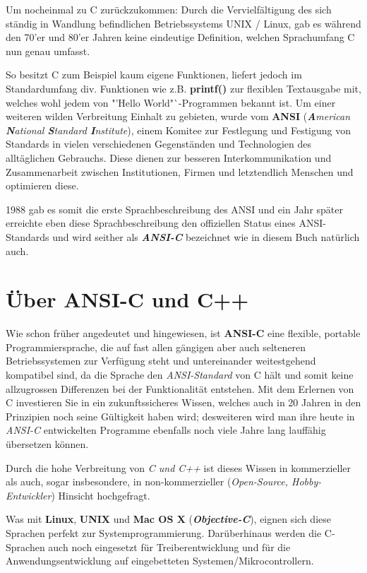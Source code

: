 \documentclass[b5paper,10pt,dvips,fleqn,titlepage,twoside]{book}
\begin{document}
Um nocheinmal zu C zurückzukommen: Durch die Vervielfältigung des sich ständig in Wandlung befindlichen Betriebssystems UNIX / Linux, gab es während den 70'er und 80'er Jahren keine eindeutige Definition, welchen Sprachumfang C nun genau umfasst.

So besitzt C zum Beispiel kaum eigene Funktionen, liefert jedoch im Standardumfang div. Funktionen wie z.B. \textbf{printf()} zur flexiblen Textausgabe mit, welches wohl jedem von "'Hello World"`-Programmen bekannt ist.
Um einer weiteren wilden Verbreitung Einhalt zu gebieten, wurde vom \textbf{ANSI} (\emph{\textbf{A}merican \textbf{N}ational \textbf{S}tandard \textbf{I}nstitute}), einem Komitee zur Festlegung und Festigung von Standards in vielen verschiedenen Gegenständen und Technologien des alltäglichen Gebrauchs. Diese dienen zur besseren Interkommunikation und Zusammenarbeit zwischen Institutionen, Firmen und letztendlich Menschen und optimieren diese.

1988 gab es somit die erste Sprachbeschreibung des ANSI und ein Jahr später erreichte eben diese Sprachbeschreibung den offiziellen Status eines ANSI-Standards und wird seither als \textbf{\emph{ANSI-C}} bezeichnet \lbrack wie in diesem Buch natürlich auch.\rbrack
\newline
\section{Über ANSI-C und C++}
Wie schon früher angedeutet und hingewiesen, ist \textbf{ANSI-C} eine flexible, portable Programmiersprache, die auf fast allen gängigen aber auch selteneren Betriebssystemen zur Verfügung steht und untereinander weitestgehend kompatibel sind, da die Sprache den \emph{ANSI-Standard} von C hält und somit keine allzugrossen Differenzen bei der Funktionalität entstehen.
Mit dem Erlernen von C investieren Sie in ein zukunftssicheres Wissen, welches auch in 20 Jahren in den Prinzipien noch seine Gültigkeit haben wird; desweiteren wird man ihre heute in \emph{ANSI-C} entwickelten Programme ebenfalls noch viele Jahre lang lauffähig übersetzen können.

Durch die hohe Verbreitung von \emph{C und C++} ist dieses Wissen in kommerzieller als auch, sogar insbesondere, in non-kommerzieller (\emph{Open-Source, Hobby-Entwickler}) Hinsicht hochgefragt.

Was mit \textbf{Linux}, \textbf{UNIX} und \textbf{Mac OS X} (\emph{\textbf{Objective-C}}), eignen sich diese Sprachen perfekt zur Systemprogrammierung. Darüberhinaus werden die C-Sprachen auch noch eingesetzt für Treiberentwicklung und für die Anwendungsentwicklung auf eingebetteten Systemen/Mikrocontrollern.
\end{document}
